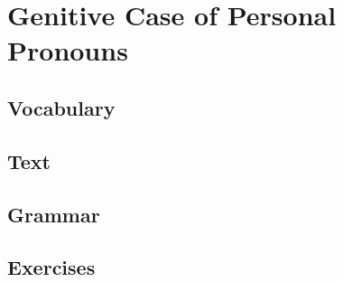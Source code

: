 \chapter{Genitive Case of Personal Pronouns}
\section*{Vocabulary}
\section*{Text}
\section*{Grammar}
\section*{Exercises}
